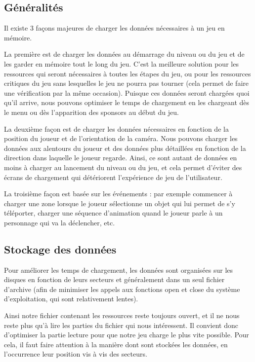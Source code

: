 \documentclass[a4paper, 12pt]{article} %
\begin{document}
\subsection{Généralités}
Il existe 3 façons majeures de charger les données nécessaires à un jeu en mémoire.

La première est de charger les données au démarrage du niveau ou du jeu et de les garder en mémoire tout le long du jeu. C'est la meilleure solution pour les ressources qui seront nécessaires à toutes les étapes du jeu, ou pour les ressources critiques du jeu sans lesquelles le jeu ne pourra pas tourner (cela permet de faire une vérification par la même occasion). Puisque ces données seront chargées quoi qu'il arrive, nous pouvons optimiser le temps de chargement en les chargeant dès le menu ou dès l'apparition des sponsors au début du jeu.

La deuxième façon est de charger les données nécessaires en fonction de la position du joueur et de l'orientation de la caméra. Nous pouvons charger les données aux alentours du joueur et des données plus détaillées en fonction de la direction dans laquelle le joueur regarde. Ainsi, ce sont autant de données en moins à charger au lancement du niveau ou du jeu, et cela permet d'éviter des écrans de chargement qui détériorent l’expérience de jeu de l'utilisateur.

La troisième façon est basée sur les événements : par exemple commencer à charger une zone lorsque le joueur sélectionne un objet qui lui permet de s'y téléporter, charger une séquence d'animation quand le joueur parle à un personnage qui va la déclencher, etc.

\newpage
\subsection{Stockage des données}
Pour améliorer les temps de chargement, les données sont organisées sur les disques en fonction de leurs secteurs et généralement dans un seul fichier d'archive (afin de minimiser les appels aux fonctions open et close du système d'exploitation, qui sont relativement lentes).


Ainsi notre fichier contenant les ressources reste toujours ouvert, et il ne nous reste plus qu'à lire les parties du fichier qui nous intéressent. Il convient donc d'optimiser la partie lecture pour que notre jeu charge le plus vite possible. Pour cela, il faut faire attention à la manière dont sont stockées les données, en l’occurrence leur position vis à vis des secteurs.
\end{document}
